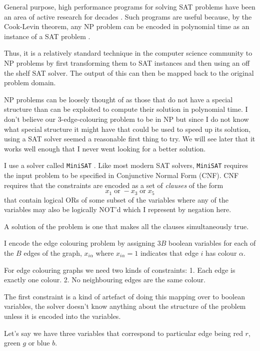 General purpose, high performance programs for solving SAT problems have been an area of active research for decades \textcite{alounehComprehensiveStudyAnalysis2019}. Such programs are useful because, by the Cook-Levin theorem, any NP problem can be encoded in polynomial time as an instance of a SAT problem \autocite{cookComplexityTheoremprovingProcedures1971,levin1973universal}.

Thus, it is a relatively standard technique in the computer science community to NP problems by first transforming them to SAT instances and then using an off the shelf SAT solver. The output of this can then be mapped back to the original problem domain.

NP problems can be loosely thought of as those that do not have a special structure than can be exploited to compute their solution in polynomial time. I don't believe our 3-edge-colouring problem to be in NP but since I do not know what special structure it might have that could be used to speed up its solution, using a SAT solver seemed a reasonable first thing to try. We will see later that it works well enough that I never went looking for a better solution.

I use a solver called \texttt{MiniSAT} \autocite{imms-sat18}. Like most modern SAT solvers, \texttt{MiniSAT} requires the input problem to be specified in Conjunctive Normal Form (CNF). CNF requires that the constraints are encoded as a set of \emph{clauses} of the form \[x_1 \;\textrm{or}\; -x_3 \;\textrm{or}\; x_5\] that contain logical ORs of some subset of the variables where any of the variables may also be logically NOT'd which I represent by negation here.

A solution of the problem is one that makes all the clauses simultaneously true.

I encode the edge colouring problem by assigning \(3B\) boolean variables for each of the \(B\) edges of the graph, \(x_{i\alpha}\) where \(x_{i\alpha} = 1\) indicates that edge \(i\) has colour \(\alpha\).

For edge colouring graphs we need two kinds of constraints: 1. Each edge is exactly one colour. 2. No neighbouring edges are the same colour.

The first constraint is a kind of artefact of doing this mapping over to boolean variables, the solver doesn't know anything about the structure of the problem unless it is encoded into the variables.

Let's say we have three variables that correspond to particular edge being red \(r\), green \(g\) or blue \(b\).


